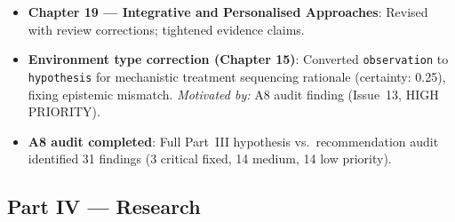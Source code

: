 \begin{itemize}
  \item \textbf{Chapter 19 --- Integrative and Personalised Approaches}: Revised
    with review corrections; tightened evidence claims.

  \item \textbf{Environment type correction (Chapter 15)}: Converted
    \texttt{observation} to \texttt{hypothesis} for mechanistic treatment
    sequencing rationale (certainty: 0.25), fixing epistemic mismatch.
    \textit{Motivated by:} A8 audit finding (Issue~13, HIGH PRIORITY).

  \item \textbf{A8 audit completed}: Full Part~III hypothesis vs.\ recommendation
    audit identified 31 findings (3 critical fixed, 14 medium, 14 low priority).

\end{itemize}

\subsection*{Part IV --- Research}

